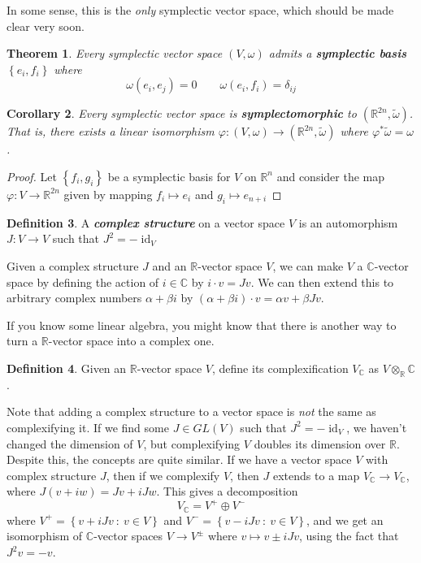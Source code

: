 \documentclass[psamsfonts]{amsart}
\newtheorem{thm}{Theorem}[section]
\newtheorem{cor}[thm]{Corollary}
\theoremstyle{definition}
\newtheorem{defn}[thm]{Definition}
\theoremstyle{remark}
\newcommand{\R}{\mathbb{R}}
\newcommand{\ib}[1]{\textbf{\textit{#1}}}
\newcommand{\C}{\mathbb{C}}
\newcommand{\set}[1]{\left\lbrace #1 \right\rbrace}
\DeclareMathOperator{\id}{id}
\begin{document}
In some sense, this is the \emph{only} symplectic vector space, which should be made clear very soon.
\begin{thm}
Every symplectic vector space $(V,\omega)$ admits a \ib{symplectic basis} $\set{e_i, f_i}$ where
$$\omega(e_i,e_j) = 0 \qquad \omega(e_i,f_i) = \delta_{ij}$$
\end{thm}
%
\begin{cor}
Every symplectic vector space is \ib{symplectomorphic} to $(\R^{2n}, \tilde{\omega})$. That is, there exists a linear isomorphism $\varphi: (V,\omega) \to (\R^{2n},\tilde{\omega})$ where $\varphi^*\tilde{\omega} = \omega$.
\end{cor}
%
\begin{proof}
Let $\set{f_i,g_i}$ be a symplectic basis for $V$ on $\R^n$ and consider the map $\varphi: V \to \R^{2n}$ given by mapping $f_i \mapsto e_i$ and $g_i \mapsto e_{n + i}$
\end{proof}
%
\begin{defn}
A \ib{complex structure} on a vector space $V$ is an automorphism $J: V \to V$ such that $J^2 = -\id_V$
\end{defn}
%
Given a complex structure $J$ and an $\R$-vector space $V$, we can make $V$ a $\C$-vector space by defining the action of $i \in \C$ by $i \cdot v = Jv$. We can then extend this to arbitrary complex numbers $\alpha + \beta i$ by $(\alpha + \beta i)\cdot v = \alpha v + \beta Jv$.

If you know some linear algebra, you might know that there is another way to turn a $\R$-vector space into a complex one. 
\begin{defn}
Given an $\R$-vector space $V$, define its complexification $V_\C$ as $V \otimes_\R \C$.
\end{defn}
Note that adding a complex structure to a vector space is \emph{not} the same as complexifying it. If we find some $J \in GL(V)$ such that $J^2 = -\id_V$, we haven't changed the dimension of $V$, but complexifying $V$ doubles its dimension over $\R$. Despite this, the concepts are quite similar. If we have a vector space $V$ with complex structure $J$, then if we complexify $V$, then $J$ extends to a map $V_\C \to V_\C$, where $J(v + i w) = Jv + iJw$. This gives a decomposition
$$V_\C = V^+ \oplus V^- $$
where $V^+ = \set{v + iJv ~:~v \in V}$ and $V^- = \set{v - iJv ~:~ v \in V}$, and we get an isomorphism of $\C$-vector spaces $V \to V^\pm$ where $v \mapsto v \pm iJv$, using the fact that $J^2v = -v$.
\end{document}
